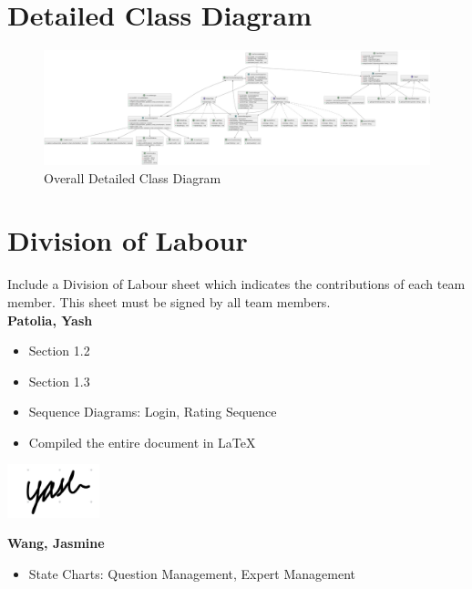 \documentclass[]{article}
\numberwithin{figure}{section}
\begin{document}
\clearpage
\section{Detailed Class Diagram}
\label{sec:detailed_class_diagram}
\begin{figure}[h]
    \centering
    \includegraphics[width=1\textwidth]{diagrams/Class_Diagram.png} %
    \caption{Overall Detailed Class Diagram\\}
\end{figure}

\clearpage
\appendix
\section{Division of Labour}
\label{sec:division_of_labour}
Include a Division of Labour sheet which indicates the contributions of each team member. This sheet must be signed by all team members.\\

\noindent
\textbf{Patolia, Yash}
\begin{itemize}
	\item Section 1.2
	\item Section 1.3
	\item Sequence Diagrams: Login, Rating Sequence
	\item Compiled the entire document in LaTeX
\end{itemize}

\includegraphics[width=0.2\textwidth]{signatures/yash.png} %

\noindent
\textbf{Wang, Jasmine}
\begin{itemize}
	\item State Charts: Question Management, Expert Management
\end{itemize}
\end{document}
